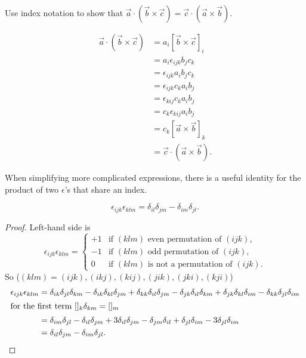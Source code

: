 \documentclass[10pt, a4paper]{article}
\begin{document}
\begin{example}
    Use index notation to show that $\vec{a} \cdot(\vec{b} \times \vec{c}) = \vec{c} \cdot(\vec{a} \times \vec{b})$.

    \begin{solution}
        \begin{align*}
            \vec{a} \cdot (\vec{b}\times\vec{c}) &= a_i[\vec{b} \times \vec{c}]_i \\
            &= a_i\epsilon_{ijk}b_jc_k \\
            &= \epsilon_{ijk}a_ib_jc_k \\
            &= \epsilon_{ijk}c_ka_ib_j \\
            &= \epsilon_{kij}c_ka_ib_j \\
            &= c_k\epsilon_{kij}a_ib_j \\
            &= c_k[\vec{a} \times \vec{b}]_k \\
            &= \vec{c} \cdot (\vec{a} \times \vec{b}).
        \end{align*}
    \end{solution}
\end{example}

When simplifying more complicated expressions,
there is a useful identity for the product of two $\epsilon$'s that share an index.

\begin{proposition}
    \[
    \epsilon_{ijk}\epsilon_{klm} = \delta_{il}\delta_{jm} - \delta_{im}\delta_{jl}.
    \]

    \begin{proof}
        Left-hand side is
        \[
        \epsilon_{ijk}\epsilon_{klm} = \begin{cases}
            +1 &\text{if $(klm)$ even permutation of $(ijk)$}, \\
            -1 &\text{if $(klm)$ odd permutation of $(ijk)$}, \\
            0 &\text{if $(klm)$ is not a permutation of $(ijk)$}.
        \end{cases}
        \]
        So
        ($(klm) = (ijk), (ikj), (kij), (jik), (jki), (kji)$)
        \[
        \]
        \begin{align*}
            \epsilon_{ijk}\epsilon_{klm} &= \delta_{ik}\delta_{jl}\delta_{km} - \delta_{ik}\delta_{kl}\delta_{jm} + \delta_{kk}\delta_{il}\delta_{jm} - \delta_{jk}\delta_{il}\delta_{km} + \delta_{jk}\delta_{kl}\delta_{im} - \delta_{kk}\delta_{jl}\delta_{im} \\
            \intertext{for the first term $[]_k\delta_{km} = []_m$}
            &= \delta_{im}\delta_{jl} - \delta_{il}\delta_{jm} + 3\delta_{il}\delta_{jm} - \delta_{jm}\delta_{il} + \delta_{jl}\delta_{im} - 3\delta_{jl}\delta_{im} \\
            &= \delta_{il}\delta_{jm} - \delta_{im}\delta_{jl}.
        \end{align*}
    \end{proof}
\end{proposition}
\end{document}
